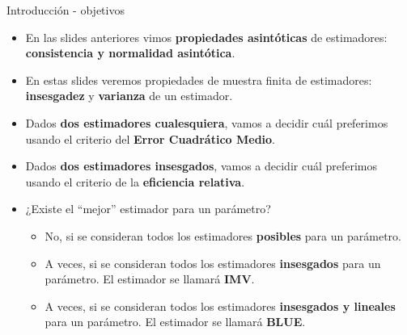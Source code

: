 \documentclass{beamer}
\title{\color{black}{Análisis Estadístico}}
\subtitle{\color{rosee}Propiedades de estimadores y estimación puntual I}
\institute[]{UTDT}
\date[UTDT 2022]{}
\theoremstyle{definition}
\begin{document}
\begin{frame}
  \titlepage
\end{frame}


\begin{frame}{\color{rosee}Introducción - objetivos}
\begin{itemize}
    \item En las slides anteriores vimos \textbf{propiedades asintóticas} de estimadores: \textbf{consistencia y normalidad asintótica}.
    \item En estas slides veremos propiedades de muestra finita de estimadores: \textbf{insesgadez} y \textbf{varianza} de un estimador.
    \item Dados \textbf{dos estimadores cualesquiera}, vamos a decidir cuál preferimos usando el criterio del \textbf{Error Cuadrático Medio}.
    \item Dados \textbf{dos estimadores insesgados}, vamos a decidir cuál preferimos usando el criterio de la \textbf{eficiencia relativa}.
    \item ¿Existe el ``mejor'' estimador para un parámetro?
    \begin{itemize}
    \item No, si se consideran todos los estimadores \textbf{posibles} para un parámetro.
    \item A veces, si se consideran todos los estimadores \textbf{insesgados} para un parámetro. El estimador se llamará \textbf{IMV}.
    \item A veces, si se consideran todos los estimadores \textbf{insesgados y lineales} para un parámetro. El estimador se llamará \textbf{BLUE}.
    \end{itemize}
\end{itemize}
 
   

\end{frame}
\end{document}
